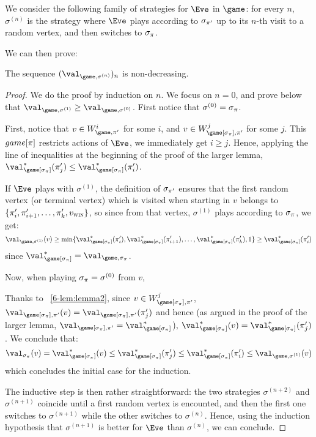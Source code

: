 We consider the following family of strategies for $\Eve$ in $\game$:
for every $n$, $\sigma^{(n)}$ is the strategy where $\Eve$ plays
according to $\sigma_{\pi'}$ up to its $n$-th visit to a random
vertex, and then switches to $\sigma_\pi$. 

We can then prove:
\begin{lemma}
\label{6-lem:convergence_sequence_values}
The sequence $(\val_{\game,\sigma^{(n)}})_n$ is non-decreasing.
\end{lemma}

\begin{proof}
We do the proof by induction on $n$.  We focus on $n=0$, and prove
below that $\val_{\game,\sigma^{(1)}} \ge
\val_{\game,\sigma^{(0)}}$. First notice that $\sigma^{(0)} =
\sigma_\pi$.

First, notice that $v \in W_{\game,\perm'}^i$ for some $i$, and $v
\in W_{\game[\sigma_\perm],\perm'}^j$ for some $j$. This
$game[\pi]$ restricts actions of $\Eve$, we immediately get $i \ge j$. 
Hence, applying the line of inequalities at the beginning of
the proof of the larger lemma,
$\val^*_{\game[\sigma_\perm]}(\perm'_j) \le
\val^*_{\game[\sigma_\perm]}(\perm'_i)$.

If $\Eve$ plays with $\sigma^{(1)}$, the definition of
$\sigma_{\pi'}$ ensures that the first random vertex (or
terminal vertex) which is visited when starting in $v$ belongs to
$\{\pi'_i,\pi'_{i+1},\dots,\pi'_k,v_{\textsc{win}}\}$, so since from
that vertex, $\sigma^{(1)}$ plays according to $\sigma_\pi$, we
get:
\[
\val_{\game,\sigma^{(1)}}(v) \ge \min
\{\val^*_{\game[\sigma_\perm]}(\perm'_i),
\val^*_{\game[\sigma_\perm]}(\perm'_{i+1}),\dots,
\val^*_{\game[\sigma_\perm]}(\perm'_k),1\} \ge
\val^*_{\game[\sigma_\perm]}(\perm'_i)
\]
since $\val^*_{\game[\sigma_\perm]} = \val_{\game,\sigma_\perm}$.

Now, when playing $\sigma_\pi = \sigma^{(0)}$ from $v$, 

Thanks to ~\cref{6-lem:lemma2}, since $v \in
W_{\game[\sigma_\perm],\perm'}^j$,
$\val_{\game[\sigma_\perm],\perm'}(v) =
\val_{\game[\sigma_\perm],\perm'}(\perm'_j)$ and hence (as argued
in the proof of the larger lemma,
$\val_{\game[\sigma_\perm],\perm'} =
\val^*_{\game[\sigma_\perm]}$), $\val^*_{\game[\sigma_\perm]}(v) =
\val^*_{\game[\sigma_\perm]}(\perm'_j)$. We conclude that:
\[
\val_{\sigma_\perm}(v) = \val^*_{\game[\sigma_\perm]}(v) \le
\val^*_{\game[\sigma_\perm]}(\perm'_j) \le
\val^*_{\game[\sigma_\perm]}(\perm'_i) \le
\val_{\game,\sigma^{(1)}}(v)
\]
which concludes the initial case for the induction.

\smallskip The inductive step is then rather straightforward: the
two strategies $\sigma^{(n+2)}$ and $\sigma^{(n+1)}$ coincide
until a first random vertex is encounted, and then the first one
switches to $\sigma^{(n+1)}$ while the other switches to
$\sigma^{(n)}$. Hence, using the induction hypothesis that
$\sigma^{(n+1)}$ is better for $\Eve$ than $\sigma^{(n)}$, we can
conclude.
\end{proof}

